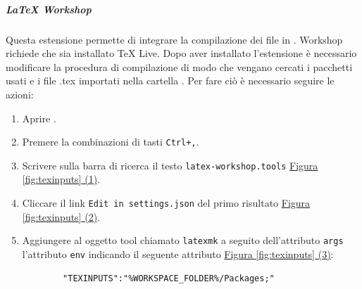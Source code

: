 \subparagraph{LaTeX Workshop}
Questa estensione permette di integrare la compilazione dei file  in .
 Workshop richiede che sia installato TeX Live.
Dopo aver installato l'estensione è necessario modificare la procedura di compilazione di modo che vengano cercati i pacchetti usati e i file .tex importati nella cartella .
Per fare ciò è necessario seguire le azioni:
\begin{enumerate}
    \item Aprire .
    
    \item Premere la combinazioni di tasti \texttt{Ctrl+,}.
    
    \item Scrivere sulla barra di ricerca il testo \texttt{latex-workshop.tools} \hyperref[fig:texinputs]{Figura \ref{fig:texinputs} (1)}.
    
    \item Cliccare il link \texttt{Edit in settings.json} del primo risultato \hyperref[fig:texinputs]{Figura \ref{fig:texinputs} (2)}.
    
    \item Aggiungere al oggetto tool chiamato \texttt{latexmk} a seguito dell'attributo \texttt{args} l'attributo \texttt{env} indicando il seguente attributo \hyperref[fig:texinputs]{Figura \ref{fig:texinputs} (3)}: 
    \begin{lstlisting}
        "TEXINPUTS":"%WORKSPACE_FOLDER%/Packages;"
    \end{lstlisting}
\end{enumerate}

